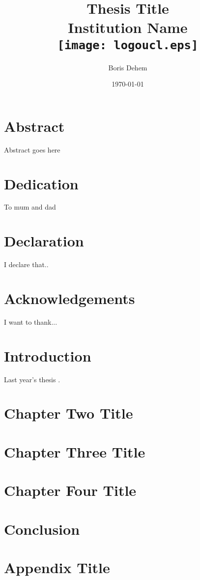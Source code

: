 \documentclass[12pt,a4paper,twoside]{report}
\title{
	{Thesis Title}\\
	{\large Institution Name}\\
	{\texttt{[image: logoucl.eps]}}
}
\author{Boris Dehem}
\date{\today}
\begin{document}


\chapter*{Abstract}
Abstract goes here

\chapter*{Dedication}
To mum and dad

\chapter*{Declaration}
I declare that..

\chapter*{Acknowledgements}
I want to thank...

\tableofcontents

\chapter{Introduction}

Last year's thesis \cite{jacquesleclere}.

\chapter{Chapter Two Title}


\chapter{Chapter Three Title}


\chapter{Chapter Four Title}


\chapter{Conclusion}


\printbibliography

\appendix
\chapter{Appendix Title}

\end{document}
